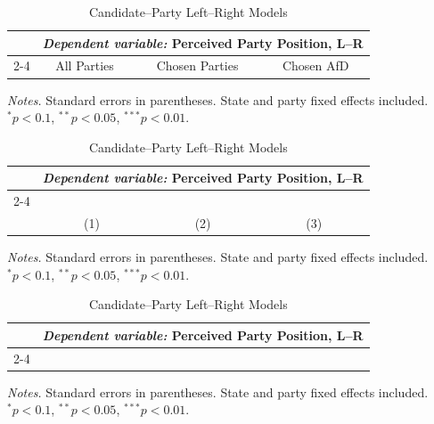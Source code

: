 \begin{table}[!htbp]\centering
\caption{Candidate--Party Left--Right Models}
\label{tab:cand_party_lr}
\begin{tabular}{lccc}
\toprule
 & \multicolumn{3}{c}{\textit{Dependent variable:} Perceived Party Position, L--R} \\
\cmidrule(lr){2-4}
 & All Parties & Chosen Parties & Chosen AfD \\ \bottomrule
\end{tabular}
\vspace{0.2em}
{\footnotesize \textit{Notes.} Standard errors in parentheses. State and party fixed effects included. \\$^{*}p<0.1$, $^{**}p<0.05$, $^{***}p<0.01$.}
\end{table}

\begin{table}[!htbp]\centering
\caption{Candidate--Party Left--Right Models}
\label{tab:cand_party_lr}
\begin{tabular}{lccc}
\toprule
 & \multicolumn{3}{c}{\textit{Dependent variable:} Perceived Party Position, L--R} \\
\cmidrule(lr){2-4}
\\[-1.8ex] & (1) & (2) & (3)\\ \bottomrule
\end{tabular}
\vspace{0.2em}
{\footnotesize \textit{Notes.} Standard errors in parentheses. State and party fixed effects included. \\$^{*}p<0.1$, $^{**}p<0.05$, $^{***}p<0.01$.}
\end{table}

\begin{table}[!htbp]\centering
\caption{Candidate--Party Left--Right Models}
\label{tab:cand_party_lr}
\begin{tabular}{lccc}
\toprule
 & \multicolumn{3}{c}{\textit{Dependent variable:} Perceived Party Position, L--R} \\
\cmidrule(lr){2-4}
\hline \\[-1.8ex] \bottomrule
\end{tabular}
\vspace{0.2em}
{\footnotesize \textit{Notes.} Standard errors in parentheses. State and party fixed effects included. \\$^{*}p<0.1$, $^{**}p<0.05$, $^{***}p<0.01$.}
\end{table}

